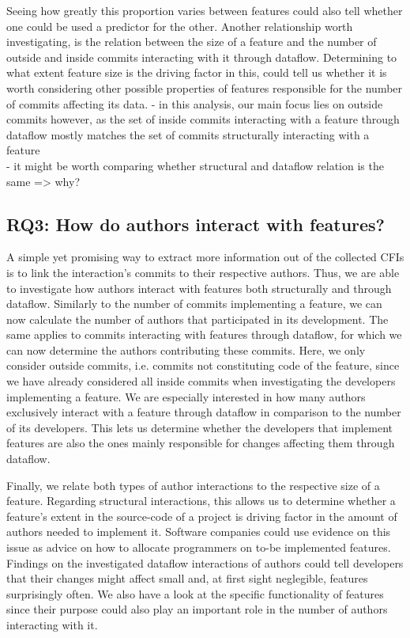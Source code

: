 Seeing how greatly this proportion varies between features could also tell whether one could be used a predictor for the other.
Another relationship worth investigating, is the relation between the size of a feature and the number of outside and inside commits interacting with it through dataflow.
Determining to what extent feature size is the driving factor in this, could tell us whether it is worth considering other possible properties of features responsible for the number of commits affecting its data.
- in this analysis, our main focus lies on outside commits however, as the set of inside commits interacting with a feature through dataflow mostly matches the set of commits structurally interacting with a feature \\
- it might be worth comparing whether structural and dataflow relation is the same => why?

\subsection*{\textbf{RQ3: How do authors interact with features?}}

A simple yet promising way to extract more information out of the collected CFIs is to link the interaction's commits to their respective authors.
Thus, we are able to investigate how authors interact with features both structurally and through dataflow.
Similarly to the number of commits implementing a feature, we can now calculate the number of authors that participated in its development.
The same applies to commits interacting with features through dataflow, for which we can now determine the authors contributing these commits.
Here, we only consider outside commits, i.e. commits not constituting code of the feature, since we have already considered all inside commits when investigating the developers implementing a feature.
We are especially interested in how many authors exclusively interact with a feature through dataflow in comparison to the number of its developers.
This lets us determine whether the developers that implement features are also the ones mainly responsible for changes affecting them through dataflow.

Finally, we relate both types of author interactions to the respective size of a feature.
Regarding structural interactions, this allows us to determine whether a feature's extent in the source-code of a project is driving factor in the amount of authors needed to implement it. 
Software companies could use evidence on this issue as advice on how to allocate programmers on to-be implemented features.
Findings on the investigated dataflow interactions of authors could tell developers that their changes might affect small and, at first sight neglegible, features surprisingly often.
We also have a look at the specific functionality of features since their purpose could also play an important role in the number of authors interacting with it.

